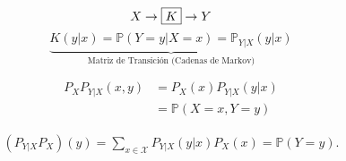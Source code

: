 \begin{observation}
\begin{equation*}
    X\to\fbox{$K$}\to Y
\end{equation*}
\begin{equation*}
    \underbrace{{K(y|x)}=\mathbb{P}(Y=y|X=x)=\mathbb{P}_{Y|X}(y|x)}_{\textrm{Matriz de Transici\'on (Cadenas de Markov)}}
\end{equation*}
\end{observation}

\begin{notation}
        \begin{align*}
            P_{X}P_{Y|X}(x,y)&=P_{X}(x)P_{Y|X}(y|x)\\
            &=\mathbb{P}(X=x,Y=y)
        \end{align*}
\end{notation}
\begin{notation}
        \begin{align*}
            (P_{Y|X}P_{X})(y)=\sum_{x\in\mathcal{X}}P_{Y|X}(y|x)P_{X}(x)=\mathbb{P}(Y=y).
        \end{align*}
\end{notation}
